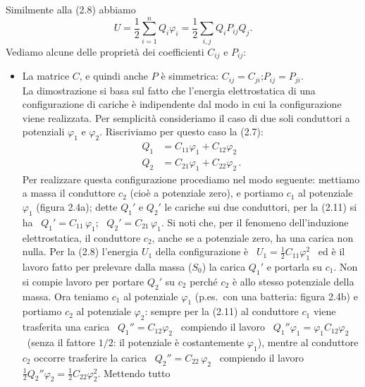 Similmente alla (2.8) abbiamo
\begin{equation}
  U=\frac12\sum_{i=1}^nQ_i\varphi_i=\frac12\sum_{i,j}Q_iP_{ij}Q_j.
  \tag{2.10}
\end{equation}
Vediamo alcune delle propriet\`a dei coefficienti $C_{ij}$ e $P_{ij}$:
\begin{itemize}
  \item[i)] La matrice $C$, e quindi anche $P$ \`e simmetrica:
    $C_{ij}=C_{ji}$;\quad $P_{ij}=P_{ji}$.\\
    La dimostrazione si basa sul fatto che l'energia elettrostatica di una
    configurazione di cariche \`e indipendente dal modo in cui la configurazione
    viene realizzata. Per semplicit\`a consideriamo il caso di due soli
    conduttori a potenziali $\varphi_1$ e $\varphi_2$. Riscriviamo per questo
    caso la (2.7):
    \begin{equation}
      \begin{aligned}
        Q_1&=C_{11}\varphi_1+C_{12}\varphi_2\\
        Q_2&=C_{21}\varphi_1+C_{22}\varphi_2\,.
      \end{aligned}
      \tag{2.11}
    \end{equation}
    Per realizzare questa configurazione procediamo nel modo seguente: mettiamo
    a massa il conduttore $c_2$ (cio\`e a potenziale zero), e portiamo $c_1$ al
    potenziale $\varphi_1$ (figura 2.4a); dette $Q_1'$ e $Q_2'$ le cariche sui
    due conduttori, per la (2.11) si ha \ $Q_1'=C_{11}\,\varphi_1$;
    \ $Q_2'=C_{21}\,\varphi_1$. Si noti che, per il fenomeno dell'induzione
    elettrostatica, il conduttore $c_2$, anche se a potenziale zero, ha una
    carica non nulla. Per la (2.8) l'energia $U_1$ della configurazione \`e
    \ $U_1=\frac12C_{11}\varphi_1^2$ \ ed \`e il lavoro fatto per prelevare
    dalla massa ($S_0$) la carica $Q_1'$ e portarla su $c_1$. Non si compie
    lavoro per portare $Q_2'$ su $c_2$ perch\'e $c_2$ \`e allo stesso potenziale
    della massa. Ora teniamo $c_1$ al potenziale $\varphi_1$ (p.es.\ con una
    batteria: figura 2.4b) e portiamo $c_2$ al potenziale $\varphi_2$: sempre
    per la (2.11) al conduttore $c_1$ viene trasferita una carica
    \ $Q_1''=C_{12}\varphi_2$ \ compiendo il lavoro
    \ $Q_1''\varphi_1=\varphi_1C_{12}\varphi_2$ \ (senza il fattore $1/2$: il
    potenziale \`e costantemente $\varphi_1$), mentre al conduttore $c_2$
    occorre trasferire la carica \ $Q_2''=C_{22}\,\varphi_2$ \ compiendo il
    lavoro \ $\frac12Q_2''\varphi_2=\frac12C_{22}\varphi_2^2$. Mettendo tutto

\end{itemize}
